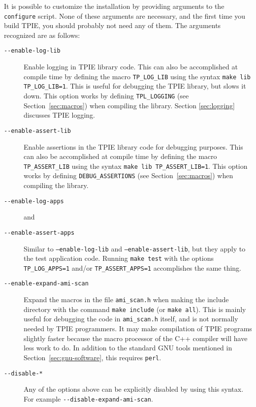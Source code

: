 It is possible to customize the installation by providing arguments to
the {\tt configure} script. None of these
arguments are necessary, and the first time you build TPIE, you should
probably not need any of them.  The arguments recognized are as
follows:
\begin{description}
\item[\verb|--enable-log-lib|] 
  Enable logging in TPIE library code.
  This can also be accomplished at compile time by defining the macro
  \verb|TP_LOG_LIB| using the syntax \verb|make lib TP_LOG_LIB=1|.
  This is useful for debugging the TPIE library, but slows it down.
  This option works by defining \verb|TPL_LOGGING|
   (see Section~\ref{sec:macros})
  when compiling the library. 
  Section \ref{sec:logging} discusses TPIE logging.
\item[\verb|--enable-assert-lib|]  
  Enable assertions in the TPIE library code for debugging purposes.
  This can also be accomplished at compile time by defining the macro
  \verb|TP_ASSERT_LIB| using the syntax \verb|make lib TP_ASSERT_LIB=1|.
  This option works by defining \verb|DEBUG_ASSERTIONS|
  (see Section~\ref{sec:macros})
  when compiling the library.
\item[\verb|--enable-log-apps|]  and
\item[\verb|--enable-assert-apps|]  
  Similar to {\tt --enable-log-lib} and {\tt --enable-assert-lib}, but
  they apply to the test application code.  Running \verb|make test|
  with the options \verb|TP_LOG_APPS=1| and/or \verb|TP_ASSERT_APPS=1|
  accomplishes the same thing.
\item[\verb|--enable-expand-ami-scan|]  Expand the macros in the file
  \verb|ami_scan.h| when making the include directory with the
command {\tt make include} (or {\tt make all}).  This is mainly useful for
debugging the code in \verb|ami_scan.h| itself, and is not normally
needed by TPIE programmers.  It may make compilation of TPIE programs
slightly faster because the macro processor of the C++ compiler will
have less work to do.  In addition to the standard GNU tools mentioned
in Section~\ref{sec:gnu-software}, this requires \verb|perl|.
\item[\verb|--disable-*|]  Any of the options above can be explicitly
  disabled  by using this syntax.  For example
  \verb|--disable-expand-ami-scan|. 
\end{description}

